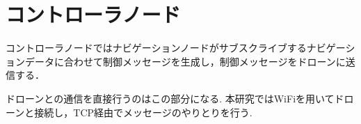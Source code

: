 \section{コントローラノード}
\label{proposed_controller}
コントローラノードではナビゲーションノードがサブスクライブするナビゲーションデータに合わせて制御メッセージを生成し，制御メッセージをドローンに送信する．

ドローンとの通信を直接行うのはこの部分になる.
本研究ではWiFiを用いてドローンと接続し，TCP経由でメッセージのやりとりを行う.
